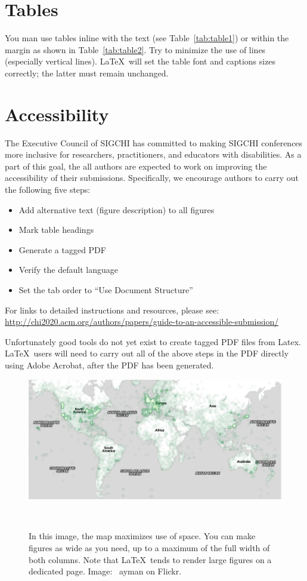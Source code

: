 \documentclass{sigchi-ext}
\begin{document}
\section{Tables}
You man use tables inline with the text (see Table~\ref{tab:table1})
or within the margin as shown in Table~\ref{tab:table2}. Try to
minimize the use of lines (especially vertical lines). \LaTeX\ will
set the table font and captions sizes correctly; the latter must
remain unchanged.

\section{Accessibility}
The Executive Council of SIGCHI has committed to making SIGCHI
conferences more inclusive for researchers, practitioners, and
educators with disabilities. As a part of this goal, the all authors
are expected to work on improving the accessibility of their
submissions. Specifically, we encourage authors to carry out the
following five steps:
\begin{itemize}\compresslist%
\item Add alternative text (figure description) to all figures
\item Mark table headings
\item Generate a tagged PDF
\item Verify the default language
\item Set the tab order to ``Use Document Structure''
\end{itemize}

For links to detailed instructions and resources, please see:
\url{http://chi2020.acm.org/authors/papers/guide-to-an-accessible-submission/}

Unfortunately good tools do not yet exist to create tagged PDF files
from Latex. \LaTeX\ users will need to carry out all of the above
steps in the PDF directly using Adobe Acrobat, after the PDF has been
generated.


\begin{figure}
  \centering
  \includegraphics[width=1.3\columnwidth]{figures/map}
  \caption{In this image, the map maximizes use of space. You can make
    figures as wide as you need, up to a maximum of the full width of
    both columns. Note that \LaTeX\ tends to render large figures on a
    dedicated page. Image: \ccbynd~ayman on Flickr.}~\label{fig:cats}
\end{figure}
\end{document}
